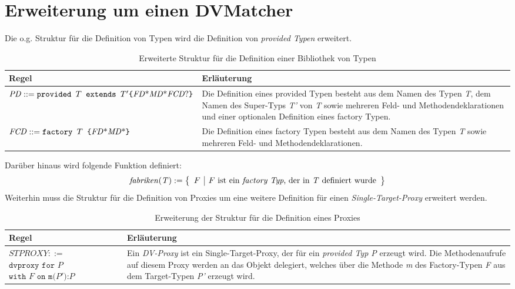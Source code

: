 \documentclass[a4paper,12pt]{article}
\begin{document}
\section{Erweiterung um einen DVMatcher}
Die o.g. Struktur für die Definition von Typen wird die Definition von \emph{provided Typen} erweitert.
\begin{table}[H]
\centering
\begin{tabular}{|p{5cm}|p{9cm}|}
\hline
\hline
\centering\textbf{Regel} & \textbf{Erläuterung} \\
\hline
\hline
$\mathit{PD} ::= \newline \texttt{provided } T \texttt{ extends }T' \newline \texttt{\{} \mathit{FD}\text{*} \mathit{MD}\text{*} \mathit{FCD}\text{?}\texttt{\}}$& Die Definition eines provided Typen besteht aus dem Namen des Typen \emph{T}, dem Namen des Super-Typs \emph{T'} von \emph{T} sowie mehreren Feld- und Methodendeklarationen und einer optionalen Definition eines factory Typen.\\
\hline
$\mathit{FCD} ::= \texttt{factory }T \texttt{ \{}\newline \mathit{FD}\text{*} \mathit{MD}\text{*} \texttt{\}} $& Die Definition eines factory Typen besteht aus dem Namen des Typen \emph{T} sowie mehreren Feld- und Methodendeklarationen.\\
\hline
\hline
\end{tabular}
\caption{Erweiterte Struktur für die Definition einer Bibliothek von Typen}
 \label{tab:extTDv}
\end{table}
\noindent
Darüber hinaus wird folgende Funktion definiert:
\begin{gather*}
\mathit{fabriken(T)} :=  \left\{ 
				\begin{array}{l|l}
					F & F \text{ ist ein \emph{factory Typ}, der in \emph{T} definiert wurde}
				\end{array}
              \right\}
\end{gather*}
Weiterhin muss die Struktur für die Definition von Proxies um eine weitere Definition für einen \emph{Single-Target-Proxy} erweitert werden.
\begin{table}[H]
\centering
\begin{tabular}{|p{4.5cm}|p{9.5cm}|}
\hline
\centering\textbf{Regel} & \textbf{Erläuterung} \\
\hline
\hline
$\mathit{STPROXY} ::=$\newline 
$\texttt{dvproxy }  \texttt{for } P$\newline
$\texttt{with } F \texttt{ on } \texttt{m(}\mathit{P'}\texttt{):}\mathit{P}$ & Ein \emph{DV-Proxy} ist ein Single-Target-Proxy, der für ein \emph{provided Typ P} erzeugt wird. Die Methodenaufrufe auf diesem Proxy werden an das Objekt delegiert, welches über die Methode \emph{m} des Factory-Typen \emph{F} aus dem Target-Typen \emph{P'} erzeugt wird.\\
\hline
\hline
\end{tabular}
\caption{Erweiterung der Struktur für die Definition eines Proxies}
 \label{tab:extPDv}
\end{table}
\end{document}
